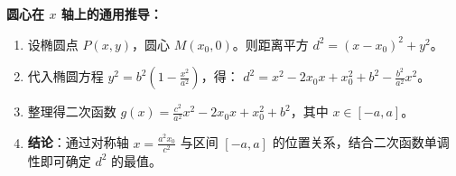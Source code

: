 \begin{proofbox}
\textbf{圆心在 $x$ 轴上的通用推导：}
\begin{enumerate}
    \item 设椭圆点 $P(x, y)$，圆心 $M(x_0, 0)$。则距离平方 $d^2 = (x-x_0)^2 + y^2$。
    \item 代入椭圆方程 $y^2 = b^2(1 - \frac{x^2}{a^2})$，得：
    $d^2 = x^2 - 2x_0x + x_0^2 + b^2 - \frac{b^2}{a^2}x^2$。
    \item 整理得二次函数 $g(x) = \frac{c^2}{a^2}x^2 - 2x_0x + x_0^2 + b^2$，其中 $x \in [-a, a]$。
    \item \textbf{结论}：通过对称轴 $x = \frac{a^2x_0}{c^2}$ 与区间 $[-a, a]$ 的位置关系，结合二次函数单调性即可确定 $d^2$ 的最值。
\end{enumerate}
\end{proofbox}